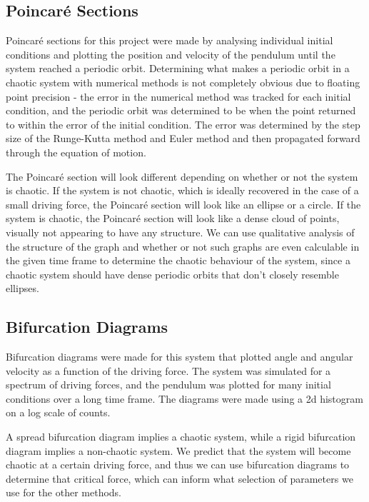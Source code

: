 \documentclass[11pt]{article} %
\begin{document}
    \subsection{Poincar\'e Sections}
        Poincar\'e sections for this project were made by analysing individual initial conditions and plotting the position
        and velocity of the pendulum until the system reached a periodic orbit.  Determining what makes a periodic orbit in a 
        chaotic system with numerical methods is not completely obvious due to floating point precision - the error in the numerical 
        method was tracked for each initial condition, and the periodic orbit was determined to be when the point returned to within the
        error of the initial condition. The error was determined by the step size of the Runge-Kutta method and Euler method and then
        propagated forward through the equation of motion.\\\vspace{3mm}

        The Poincar\'e section will look different depending on whether or not the system is chaotic. If the system is not chaotic,
        which is ideally recovered in the case of a small driving force, the Poincar\'e section will look like
        an ellipse or a circle. If the system is chaotic, the Poincar\'e section will look like a dense cloud of points, visually
        not appearing to have any structure. We can use qualitative analysis of the structure of the graph and whether or not such
        graphs are even calculable in the given time frame to determine the chaotic behaviour of the system, since a chaotic system should
        have dense periodic orbits that don't closely resemble ellipses.\\
    \subsection{Bifurcation Diagrams}
        Bifurcation diagrams were made for this system that plotted angle and angular velocity as a function of the driving force. The system
        was simulated for a spectrum of driving forces, and the pendulum was plotted for many initial conditions over a 
        long time frame. The diagrams were made using a 2d histogram on a log scale of counts.\\\vspace{3mm}

        A spread bifurcation diagram implies a chaotic system, while a rigid bifurcation diagram implies a non-chaotic
        system. We predict that the system will become chaotic at a certain driving force, and thus we can use bifurcation
        diagrams to determine that critical force, which can inform what selection of parameters we use for the other methods.\\
\end{document}
